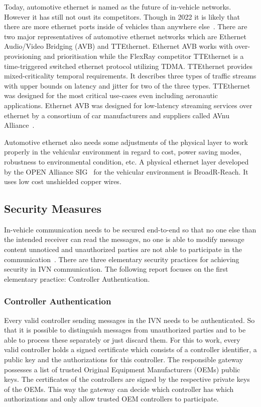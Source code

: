 Today, automotive ethernet is named as the future of in-vehicle networks.
However it has still not oust its competitors. Though in 2022 it is likely that
there are more ethernet ports inside of vehicles than anywhere
else~\cite{Ixia2014}. There are two major representatives of automotive ethernet
networks which are Ethernet Audio/Video Bridging (AVB) and TTEthernet. Ethernet
AVB works with over-provisioning and prioritisation while the FlexRay competitor
TTEthernet is a time-triggered switched ethernet protocol utilizing TDMA\@.
TTEthernet provides mixed-criticality temporal requirements. It describes three
types of traffic streams with upper bounds on latency and jitter for two of the
three types. TTEthernet was designed for the most critical use-cases even
including aeronautic applications. Ethernet AVB was designed for low-latency streaming services over ethernet by a consortium of car manufacturers and suppliers called AVnu Alliance~\cite{AVNU2018}.

Automotive ethernet also needs some adjustments of the physical layer to work
properly in the vehicular environment in regard to cost, power saving modes,
robustness to environmental condition, etc. A physical ethernet layer developed
by the OPEN Alliance SIG~\cite{SIG2018} for the vehicular environment is
BroadR-Reach. It uses low cost unshielded copper wires. 

\subsection{Security Measures}

In-vehicle communication needs to be secured end-to-end so that no one else than the intended receiver can read the messages, no one is able to modify message content unnoticed and unauthorized parties are not able to participate in the communication~\cite{Lemke2006}. There are three elementary security practices for achieving security in IVN communication. The following report focuses on the first elementary practice: Controller Authentication.

\subsubsection{Controller Authentication}

Every valid controller sending messages in the IVN needs to be authenticated. So that it is possible to distinguish messages from unauthorized parties and to be able to process these separately or just discard them. For this to work, every valid controller holds a signed certificate which consists of a controller identifier, a public key and the authorizations for this controller. The responsible gateway possesses a list of trusted Original Equipment Manufacturers (OEMs) public keys. The certificates of the controllers are signed by the respective private keys of the OEMs. This way the gateway can decide which controller has which authorizations and only allow trusted OEM controllers to participate.


